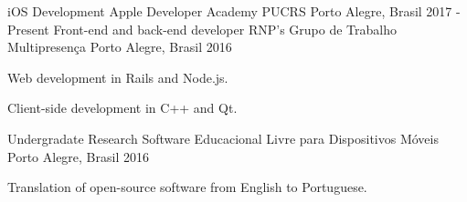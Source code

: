 \begin{cventries}
  \cventry
    {iOS Development}
    {Apple Developer Academy PUCRS}
    {Porto Alegre, Brasil}
    {2017 - Present}
    {}
  \cventry
    {Front-end and back-end developer}
    {RNP's Grupo de Trabalho Multipresença}
    {Porto Alegre, Brasil}
    {2016}
    {
      \begin{cvitems}
        \item {Web development in Rails and Node.js.}
        \item {Client-side development in C++ and Qt.}
      \end{cvitems}
    }
  \cventry
    {Undergradate Research}
    {Software Educacional Livre para Dispositivos Móveis}
    {Porto Alegre, Brasil}
    {2016}
    {
      \begin{cvitems}
        \item {Translation of open-source software from English to Portuguese.}
      \end{cvitems}
    }
\end{cventries}
